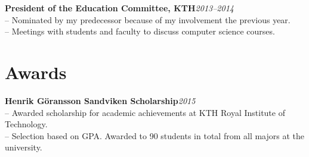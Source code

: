 \documentclass[10pt]{article}
\begin{document}
\noindent\textbf{President of the Education Committee, KTH}\hfill\textit{2013--2014} \\
-- Nominated by my predecessor because of my involvement the previous year.\\
-- Meetings with students and faculty to discuss computer science courses.

\section*{Awards}
\textbf{Henrik Göransson Sandviken Scholarship}\hfill\textit{2015}\\
-- Awarded scholarship for academic achievements at KTH Royal Institute of Technology.\\
-- Selection based on GPA. Awarded to 90 students in total from all majors at the university.
\end{document}

